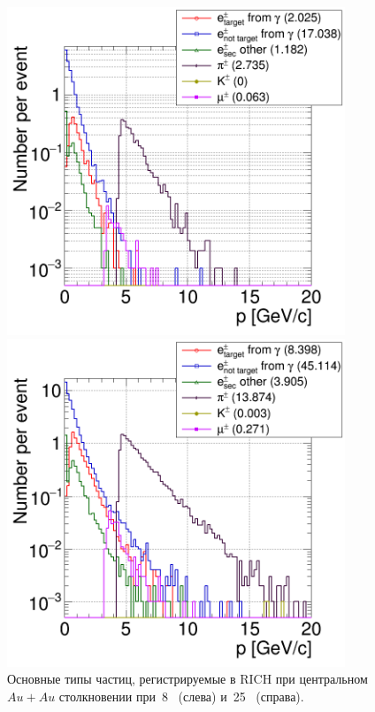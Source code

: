 \begin{figure}[H]
\begin{minipage}[t]{0.495\textwidth}
\includegraphics[width=0.9\textwidth]{pictures/RICH_8AGeV.png}
\end{minipage}
\begin{minipage}[t]{0.495\textwidth}
\includegraphics[width=0.9\textwidth]{pictures/RICH_25AGeV.png}
\end{minipage}
\caption{Основные типы частиц, регистрируемые в RICH при центральном $Au+Au$ столкновении при~8~\GeVperNucl{} (слева) и~25~\GeVperNucl{} (справа).}
\label{fig:RICH8and25AGeV}
\end{figure}

